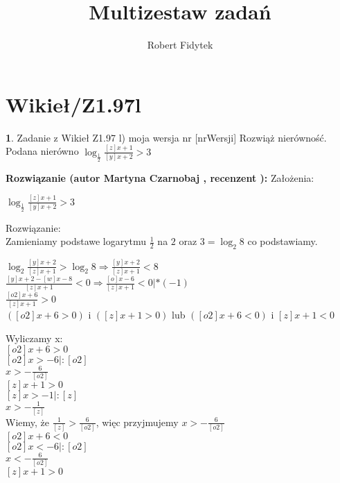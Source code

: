 \documentclass[12pt, a4paper]{article}
\title{Multizestaw zadań}
\author{Robert Fidytek}
\date{}
\theoremstyle{definition} %
\newtheorem{zad}{}
\newcommand{\kategoria}[1]{\section{#1}} %
\newcommand{\zadStart}[1]{\begin{zad}#1\newline} %
\newcommand{\zadStop}{\end{zad}}   %
\newcommand{\rozwStart}[2]{\noindent \textbf{Rozwiązanie (autor #1 , recenzent #2): }\newline} %
\begin{document}
\maketitle


\kategoria{Wikieł/Z1.97l}
\zadStart{Zadanie z Wikieł Z1.97 l) moja wersja nr [nrWersji]}
Rozwiąż nierówność.\\
Podana nierówno $ \log_\frac{1}{2} \frac{[z]x+1}{[y]x+2} > 3$\\
\zadStop
\rozwStart{Martyna Czarnobaj}{}
Założenia:\\
\begin{center}
	$ \log_\frac{1}{2} \frac{[z]x+1}{[y]x+2} > 3$\\
\end{center}
Rozwiązanie:\\
Zamieniamy podstawe logarytmu $ \frac{1}{2} $ na $ 2 $ oraz $ 3 = \log_2 8 $
co podstawiamy.\\
\begin{center}
	$ \log_2 \frac{[y]x+2}{[z]x+1} > \log_2 8 \Rightarrow \frac{[y]x+2}{[z]x+1} < 8 $\\
	$ \frac{[y]x+2-[w]x-8}{[z]x+1}<0 \Rightarrow \frac{[o]x-6}{[z]x+1} < 0 |*(-1)$\\
	$ \frac{[o2]x+6}{[z]x+1} > 0 $\\
	$ ([o2]x + 6 > 0) $ i $ ([z]x + 1 > 0)$ lub $([o2]x + 6 < 0) $ i $ [z]x + 1 < 0 $\\	
\end{center}
Wyliczamy x:\\
\newline
$ [o2]x + 6 > 0 $\\
$ [o2]x > -6 |:[o2] $\\
$ x > -\frac{6}{[o2]} $\\
\newline
$ [z]x + 1 > 0 $\\
$ [z]x > -1 |:[z]$\\
$ x > -\frac{1}{[z]} $\\
\newline
Wiemy, że $ \frac{1}{[z]} > \frac{6}{[o2]} $, więc przyjmujemy $ x > -\frac{6}{[o2]} $\\
\newline
$ [o2]x + 6 < 0 $\\
$ [o2]x < -6 |:[o2] $\\
$ x < -\frac{6}{[o2]} $\\
\newline
$ [z]x + 1 > 0 $\\
\end{document}
